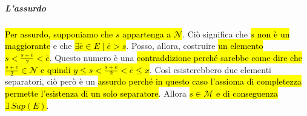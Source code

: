 \subparagraph{L'assurdo} \hl{Per assurdo, supponiamo che $s$ appartenga a 
$\mathcal{N}$}. Ciò significa che \hl{$s$ non è un maggiorante} e che 
\hl{$\exists \bar{e} \in E \mid \bar{e} > s$}. Posso, allora, costruire \hl{un 
elemento $s < \frac{s + \bar{e}}{2} < \bar{e}$}. Questo numero è una \hl{contraddizione
perché sarebbe come dire che $\frac{s + \bar{e}}{2} \in \mathcal{N}$ e quindi 
$y \leq s < \frac{s + \bar{e}}{2} < \bar{e} \leq x$}.
Così esisterebbero due elementi separatori, ciò però è un \hl{assurdo perché in
questo caso l'assioma di completezza permette l'esistenza di un solo separatore}.
Allora \hl{$s \in \mathcal{M}$ e di conseguenza $\exists \, Sup(E)$}.

